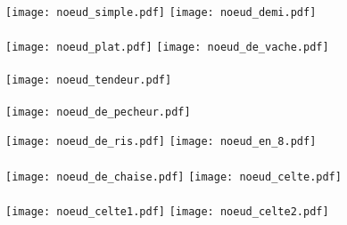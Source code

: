 \documentclass{livret}
\begin{document}
\texttt{[image: noeud\_simple.pdf]} \hfill \texttt{[image: noeud\_demi.pdf]}\\
\\
\texttt{[image: noeud\_plat.pdf]} \hfill \texttt{[image: noeud\_de\_vache.pdf]}\\
\\
\texttt{[image: noeud\_tendeur.pdf]}\\
\\
\texttt{[image: noeud\_de\_pecheur.pdf]}\\

\newpage

\texttt{[image: noeud\_de\_ris.pdf]} \hfill \texttt{[image: noeud\_en\_8.pdf]}\\
\\
\texttt{[image: noeud\_de\_chaise.pdf]} \hfill \texttt{[image: noeud\_celte.pdf]}\\
\\
\texttt{[image: noeud\_celte1.pdf]} \hfill \texttt{[image: noeud\_celte2.pdf]}\\
\end{document}
